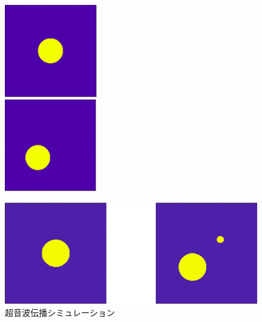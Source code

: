  \begin{figure}[H]
 \begin{minipage}{0.5\hsize}
  \begin{center}
   \includegraphics[width=40mm]{fig/daitai.pdf}
  \end{center}
 \end{minipage}
 \begin{minipage}{0.5\hsize}
 \begin{center}
  \includegraphics[width=40mm]{fig/keikotsu.pdf}
 \end{center}
 \end{minipage}
 \end{figure}
\begin{figure}[h]
  \begin{center}
    \includegraphics[width=110mm]{fig/zantei.pdf}
  \end{center}
  \caption{超音波伝播シミュレーション}
\end{figure}
